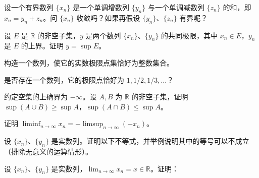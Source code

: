 \noindent\begin{minipage}{\textwidth}
设一个有界数列 $\{x_n\}$ 是一个单调增数列 $\{y_n\}$ 与一个单调减数列 $\{z_n\}$ 的和，即 $x_n=y_n+z_n$。问 $\{x_n\}$ 收敛吗？如果再假设 $\{y_n\}$、$\{z_n\}$ 有界呢？
\end{minipage}\par\vfill
\newpage
\noindent\begin{minipage}{\textwidth}
设 $E$ 是 $\mathbb R$ 的非空子集，$y$ 是两个数列 $\{x_n\}$、$\{y_n\}$ 的共同极限，其中 $x_n\in E$，$y_n$ 是 $E$ 的上界。证明 $y=\sup E$。
\end{minipage}\par\vfill
\noindent\begin{minipage}{\textwidth}
构造一个数列，使它的实数极限点集恰好为整数集合。
\end{minipage}\par\vfill
\noindent\begin{minipage}{\textwidth}
是否存在一个数列，它的极限点恰好为 $1,1/2,1/3,\ldots$？
\end{minipage}\par\vfill
\noindent\begin{minipage}{\textwidth}
约定空集的上确界为 $-\infty$。设 $A,B$ 为 $\mathbb R$ 的非空子集，证明 $\sup(A\cup B)\ge\sup A$，$\sup(A\cap B)\le\sup A$。
\end{minipage}\par\vfill
\newpage
\noindent\begin{minipage}{\textwidth}
证明 $\liminf_{n\to\infty}x_n=-\limsup_{n\to\infty}(-x_n)$。
\end{minipage}\par\vfill
\noindent\begin{minipage}{\textwidth}
设 $\{x_n\}$、$\{y_n\}$ 是实数列。证明以下不等式，并举例说明其中的等号可以不成立（排除无意义的运算情形）。
\end{minipage}\par\vfill
\noindent\begin{minipage}{\textwidth}
设 $\{x_n\}$、$\{y_n\}$ 是实数列，$\lim_{n\to\infty}x_n=x\in\mathbb R$。证明：
\end{minipage}\par\vfill
